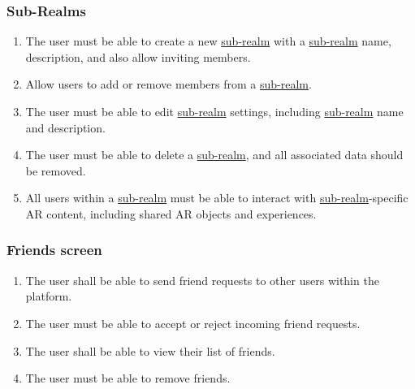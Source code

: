 \documentclass{article}
\begin{document}
\subsubsection{Sub-Realms}
\label{ssub:sub-realms}
\begin{enumerate}[align=left, label=\textbf{G-FR\arabic*:}]
    \item The user must be able to create a new \hyperref[def:sub_realm]{sub-realm} with a \hyperref[def:sub_realm]{sub-realm} name, description, and also allow inviting members.
    \item Allow users to add or remove members from a \hyperref[def:sub_realm]{sub-realm}.
    \item The user must be able to edit \hyperref[def:sub_realm]{sub-realm} settings, including \hyperref[def:sub_realm]{sub-realm} name and description.
    \item The user must be able to delete a \hyperref[def:sub_realm]{sub-realm}, and all associated data should be removed.
    \item All users within a \hyperref[def:sub_realm]{sub-realm} must be able to interact with \hyperref[def:sub_realm]{sub-realm}-specific AR content, including shared AR objects and experiences.
\end{enumerate}

\subsubsection{Friends screen}
\label{ssub:friends_screen}
\begin{enumerate}[align=left, label=\textbf{FS-FR\arabic*:}]
    \item The user shall be able to send friend requests to other users within the platform.
    \item The user must be able to accept or reject incoming friend requests.
    \item The user shall be able to view their list of friends.
    \item The user must be able to remove friends.
\end{enumerate}
\end{document}
